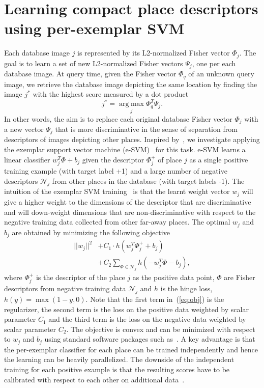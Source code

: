 \documentclass[10pt,twocolumn,letterpaper]{article}
\begin{document}
\section{Learning compact place descriptors using per-exemplar SVM}
   \label{sec:perExemplar}
   Each database image $j$ is represented by its L2-normalized Fisher vector $\Phi_j$. The goal is to learn a set of new L2-normalized Fisher vectors $\Psi_j$, one per each database image.
   At query time, given the Fisher vector $\Phi_q$ of an unknown query image, we retrieve the database image depicting the same location by finding the image $j^*$ with the highest score measured by a dot product
   \begin{equation}
       j^*=\operatorname*{arg\;max}_{j} \Phi_q^T \Psi_j. 
       \label{eq:class}
   \end{equation}
   In other words, the aim is to replace each original database Fisher vector $\Phi_j$ with a new vector $\Psi_j$ that is more discriminative in the sense of separation from descriptors of images depicting other places. Inspired by~\cite{Gronat13}, we investigate applying the exemplar support vector machine (e-SVM)~\cite{Malisiewicz11} for this task. e-SVM learns a linear classifier $w_j^T\Phi+b_j$ given the descriptor $\Phi_j^+$ of place $j$ as a single positive training example (with target label +1) and a large number of negative descriptors $\mathcal N_j$ from other places in the database (with target labels -1). The intuition of the exemplar SVM training~\cite{Malisiewicz11} is that the learnt weight vector $w_j$ will give a higher weight to the dimensions of the descriptor that are discriminative and will down-weight dimensions that are non-discriminative with respect to the negative training data collected from other far-away places.  The optimal $w_j$ and $b_j$ are obtained by minimizing the following objective  
   \begin{align}
      \label{eq:obj}
      ||w_j||^{2} &+C_1 \cdot h
         \left(
            w_j^T\Phi^+_j+b_j
         \right)  \\ \nonumber
         &+C_2\sum_{\Phi\in \mathcal N_j}h
         \left(
            -w_j^T\Phi-b_j
         \right),    
   \end{align}
   where $\Phi^+_j$ is the descriptor of the place $j$ as the positive data point, $\Phi$ are Fisher descriptors from negative training data $\mathcal N_j$ and $h$ is the hinge loss, $h(y) = \max(1-y,0)$. Note that the first term in~(\ref{eq:obj}) is the regularizer, the second term is the loss on the positive data weighted by scalar parameter $C_1$ and the third term is the loss on the negative data weighted by scalar parameter $C_2$. The objective is convex and can be minimized with respect to $w_j$ and $b_j$ using standard software packages such as~\cite{libsvm}. A key advantage is that the per-exemplar classifier for each place can be trained independently and hence the learning can be heavily parallelized. The downside of the independent training for each positive example is that the resulting scores have to be calibrated with respect to each other on additional data~\cite{Gronat13,Malisiewicz11}.
   
\end{document}
